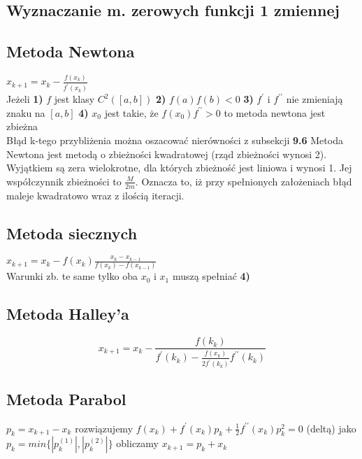 \documentclass[twocolumn]{article}
\begin{document}
\begin{flushleft}
\section{Wyznaczanie m. zerowych funkcji 1 zmiennej}
\subsection{Metoda Newtona}
$x_{k+1}=x_{k}-\frac{f(x_k)}{f^{\prime}(x_k)}$\\
Jeżeli \textbf{1)} $f$ jest klasy $C^2([a,b])$ \textbf{2)} $f(a)f(b)<0$  \textbf{3)} $f^{\prime}$ i $f^{\prime \prime}$ nie zmieniają znaku na $[a,b]$ \textbf{4)} $x_0$ jest takie, że $f(x_0)f^{\prime \prime} > 0$ to metoda newtona jest zbieżna\\
Błąd k-tego przybliżenia można oszacować nierówności z subsekcji \textbf{9.6} %
Metoda Newtona jest metodą o zbieżności kwadratowej (rząd zbieżności wynosi 2). Wyjątkiem są zera wielokrotne, dla których zbieżność jest liniowa i wynosi 1. Jej współczynnik zbieżności to $\frac{M}{2m}$.
Oznacza to, iż przy spełnionych założeniach błąd maleje kwadratowo wraz z ilością iteracji.
\subsection{Metoda siecznych}
$x_{k+1} = x_k - f(x_k)\frac{x_k-x_{k-1}}{f(x_k)-f(x_{k-1})}$\\
Warunki zb. te same tylko oba $x_0$ i $x_1$ muszą spełniać \textbf{4)}\\
\subsection{Metoda Halley'a}
$$x_{k+1}=x_k-\frac{f(k_{k})}{f^{\prime}(k_k)-\frac{f(x_k)}{2f^\prime(k_{k})}f^{\prime \prime}(k_{k})}$$
\subsection{Metoda Parabol}
$p_k=x_{k+1}-x_k$ rozwiązujemy $f(x_k) + f^{\prime}(x_k)p_k+\frac{1}{2}f^{\prime \prime}(x_k)p_k^2=0$ (deltą) jako $p_k=min\{|p_k^{(1)}|,|p_k^{(2)}|\}$ obliczamy $x_{k+1}=p_k+x_k$

\end{flushleft}
\end{document}
